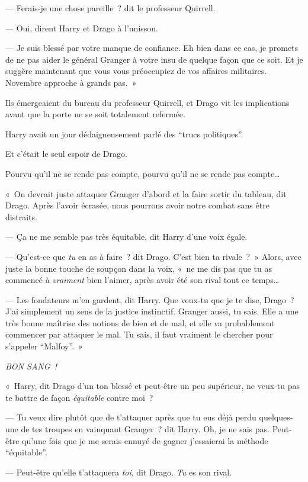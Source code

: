 --- Ferais-je une chose pareille~? dit le professeur Quirrell.

--- Oui, dirent Harry et Drago à l'unisson.

--- Je suis blessé par votre manque de confiance. Eh bien dans ce cas, je promets de ne pas aider le général Granger à votre insu de quelque façon que ce soit. Et je suggère maintenant que vous vous préoccupiez de vos affaires militaires. Novembre approche à grands pas.~»

\later

Ils émergeaient du bureau du professeur Quirrell, et Drago vit les implications avant que la porte ne se soit totalement refermée.

Harry avait un jour dédaigneusement parlé des “trucs politiques”.

Et c'était le seul espoir de Drago.

Pourvu qu'il ne se rende pas compte, pourvu qu'il ne se rende pas compte…

«~On devrait juste attaquer Granger d'abord et la faire sortir du tableau, dit Drago. Après l'avoir écrasée, nous pourrons avoir notre combat sans être distraits.

--- Ça ne me semble pas très équitable, dit Harry d'une voix égale.

--- Qu'est-ce que \emph{tu} en as à faire~? dit Drago. C'est bien ta rivale~?~» Alors, avec juste la bonne touche de soupçon dans la voix, «~ne me dis pas que tu as commencé à \emph{vraiment} bien l'aimer, après avoir été son rival tout ce temps…

--- Les fondateurs m'en gardent, dit Harry. Que veux-tu que je te dise, Drago~? J'ai simplement un sens de la justice instinctif. Granger aussi, tu sais. Elle a une très bonne maîtrise des notions de bien et de mal, et elle va probablement commencer par attaquer le mal. Tu sais, il faut vraiment le chercher pour s'appeler “Malfoy”.~»

\emph{BON SANG~!}

«~Harry, dit Drago d'un ton blessé et peut-être un peu supérieur, ne veux-tu pas te battre de façon \emph{équitable} contre moi~?

--- Tu veux dire plutôt que de t'attaquer après que tu eus déjà perdu quelques-une de tes troupes en vainquant Granger~? dit Harry. Oh, je ne sais pas. Peut-être qu'une fois que je me serais ennuyé de gagner j'essaierai la méthode “équitable”.

--- Peut-être qu'elle t'attaquera \emph{toi}, dit Drago. \emph{Tu} es son rival.

